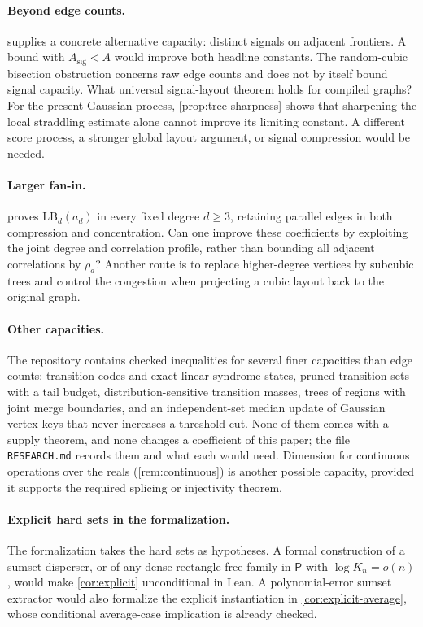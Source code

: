 \documentclass[11pt]{article}
\theoremstyle{plain}
\theoremstyle{definition}
\theoremstyle{remark}
\newcommand{\LB}{\mathrm{LB}}
\begin{document}
\paragraph{Beyond edge counts.}
 supplies a concrete alternative capacity: distinct
signals on adjacent frontiers. A bound with $A_{\mathrm{sig}}<A$ would improve both headline
constants. The random-cubic bisection obstruction concerns raw edge counts and does not
by itself bound signal capacity. What universal signal-layout theorem holds for compiled graphs?
For the present Gaussian process, \cref{prop:tree-sharpness} shows that sharpening the local
straddling estimate alone cannot improve its limiting constant. A different score process,
a stronger global layout argument, or signal compression would be needed.

\paragraph{Larger fan-in.}
 proves $\LB_d(a_d)$ in every fixed degree $d\ge3$, retaining
parallel edges in both compression and concentration. Can one improve these coefficients
by exploiting the joint degree and correlation profile, rather than bounding all adjacent
correlations by $\rho_d$? Another route is to replace higher-degree vertices by subcubic trees and control
the congestion when projecting a cubic layout back to the original graph.

\paragraph{Other capacities.}
The repository contains checked inequalities for several finer capacities than edge counts:
transition codes and exact linear syndrome states, pruned transition sets with a tail budget,
distribution-sensitive transition masses, trees of regions with joint merge boundaries, and an
independent-set median update of Gaussian vertex keys that never increases a threshold cut.
None of them comes with a supply theorem, and none changes a coefficient of this paper; the
file \texttt{RESEARCH.md} records them and what each would need. Dimension for continuous
operations over the reals (\cref{rem:continuous}) is another possible capacity, provided it
supports the required splicing or injectivity theorem.

\paragraph{Explicit hard sets in the formalization.}
The formalization takes the hard sets as hypotheses. A formal construction of a sumset
disperser, or of any dense rectangle-free family in $\mathsf P$ with $\log K_n = o(n)$, would
make \cref{cor:explicit} unconditional in Lean.
A polynomial-error sumset extractor would also formalize the explicit instantiation in
\cref{cor:explicit-average}, whose conditional average-case implication is already checked.
\end{document}

